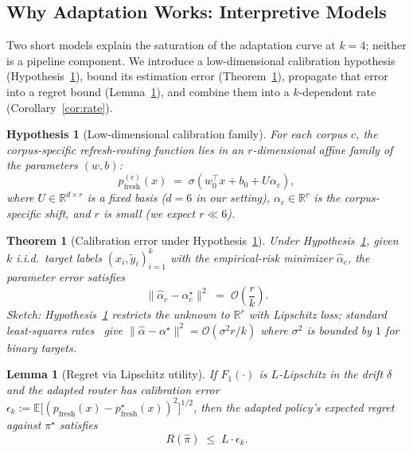 \documentclass[pdflatex,sn-basic]{sn-jnl}
\newtheorem{hypothesis}{Hypothesis}
\newtheorem{theorem}{Theorem}
\newtheorem{lemma}{Lemma}
\begin{document}
\subsection{Why Adaptation Works: Interpretive Models}
\label{sec:interpretive}

Two short models explain the saturation of the adaptation curve at $k{=}4$; neither is a pipeline component. We introduce a low-dimensional calibration hypothesis (Hypothesis~\ref{hyp:lowdim}), bound its estimation error (Theorem~\ref{thm:calib-error}), propagate that error into a regret bound (Lemma~\ref{lem:regret}), and combine them into a $k$-dependent rate (Corollary~\ref{cor:rate}).

\begin{hypothesis}[Low-dimensional calibration family]
\label{hyp:lowdim}
For each corpus $c$, the corpus-specific refresh-routing function lies in an $r$-dimensional affine family of the parameters $(w,b)$:
\[
p_{\mathrm{fresh}}^{(c)}(x) \;=\; \sigma\!\left(w_0^{\top} x + b_0 + U\alpha_c\right),
\]
where $U \in \mathbb{R}^{d \times r}$ is a fixed basis ($d{=}6$ in our setting), $\alpha_c \in \mathbb{R}^{r}$ is the corpus-specific shift, and $r$ is small (we expect $r \ll 6$).
\end{hypothesis}

\begin{theorem}[Calibration error under Hypothesis~\ref{hyp:lowdim}]
\label{thm:calib-error}
Under Hypothesis~\ref{hyp:lowdim}, given $k$ i.i.d.\ target labels $(x_i, \tilde y_i)_{i=1}^{k}$ with the empirical-risk minimizer $\hat\alpha_c$, the parameter error satisfies
\[
\big\|\hat\alpha_c - \alpha_c^{\star}\big\|^{2} \;=\; \mathcal{O}\!\left(\frac{r}{k}\right).
\]
\textit{Sketch:} Hypothesis~\ref{hyp:lowdim} restricts the unknown to $\mathbb{R}^r$ with Lipschitz loss; standard least-squares rates~\cite{wainwright2019high} give $\|\hat\alpha - \alpha^\star\|^2 = \mathcal{O}(\sigma^2 r / k)$ where $\sigma^2$ is bounded by $1$ for binary targets.
\end{theorem}

\begin{lemma}[Regret via Lipschitz utility]
\label{lem:regret}
If $F_1(\cdot)$ is $L$-Lipschitz in the drift $\delta$ and the adapted router has calibration error $\epsilon_k := \mathbb{E}\big[(p_{\mathrm{fresh}}(x) - p_{\mathrm{fresh}}^{\star}(x))^2\big]^{1/2}$, then the adapted policy's expected regret against $\pi^\star$ satisfies
\begin{equation}
\label{eq:regret}
R(\hat\pi) \;\le\; L \cdot \epsilon_k.
\end{equation}
\end{lemma}
\end{document}
